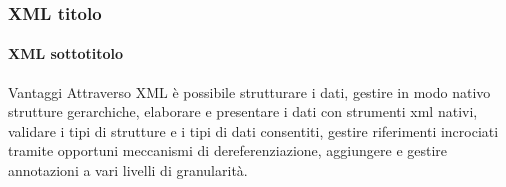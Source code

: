 \begin{frame}
	\frametitle{XML titolo}
	\framesubtitle{XML sottotitolo}
	\addtocounter{nframe}{1}

	\begin{block}{Vantaggi}
		Attraverso XML è possibile strutturare i dati, gestire in modo nativo strutture gerarchiche, elaborare e presentare i dati con strumenti xml nativi, validare i tipi di strutture e i tipi di dati consentiti, gestire riferimenti incrociati tramite opportuni meccanismi di dereferenziazione, aggiungere e gestire annotazioni a vari livelli di granularità.
	\end{block}


\end{frame}



